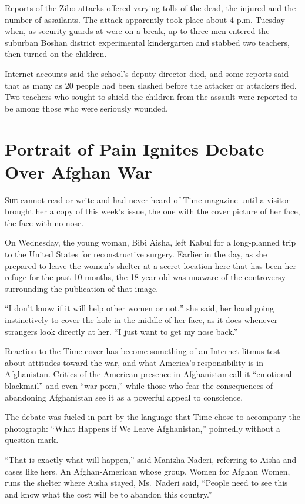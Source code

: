 ﻿\documentclass[12pt]{article}
\begin{document}
Reports of the Zibo attacks offered varying tolls of the dead, the injured and the number of
assailants. The attack apparently took place about 4 p.m. Tuesday when, as security guards at were
on a break, up to three men entered the suburban Boshan district experimental kindergarten and
stabbed two teachers, then turned on the children.

Internet accounts said the school's deputy director died, and some reports said that as many as 20
people had been slashed before the attacker or attackers fled. Two teachers who sought to shield the
children from the assault were reported to be among those who were seriously wounded.

\section{Portrait of Pain Ignites Debate Over Afghan War}

\lettrine{S}{he} cannot read or write and had never heard of Time magazine
until a visitor brought her a copy of this week's issue, the one with the cover picture of her face,
the face with no nose.

On Wednesday, the young woman, Bibi Aisha, left Kabul for a long-planned trip to the United States
for reconstructive surgery. Earlier in the day, as she prepared to leave the women's shelter at a
secret location here that has been her refuge for the past 10 months, the 18-year-old was unaware of
the controversy surrounding the publication of that image.

``I don't know if it will help other women or not,'' she said, her hand going instinctively to cover
the hole in the middle of her face, as it does whenever strangers look directly at her. ``I just
want to get my nose back.''

Reaction to the Time cover has become something of an Internet litmus test about attitudes toward
the war, and what America's responsibility is in Afghanistan. Critics of the American presence in
Afghanistan call it ``emotional blackmail'' and even ``war porn,'' while those who fear the
consequences of abandoning Afghanistan see it as a powerful appeal to conscience.

The debate was fueled in part by the language that Time chose to accompany the photograph: ``What
Happens if We Leave Afghanistan,'' pointedly without a question mark.

``That is exactly what will happen,'' said Manizha Naderi, referring to Aisha and cases like hers.
An Afghan-American whose group, Women for Afghan Women, runs the shelter where Aisha stayed,
Ms.~Naderi said, ``People need to see this and know what the cost will be to abandon this country.''
\end{document}

